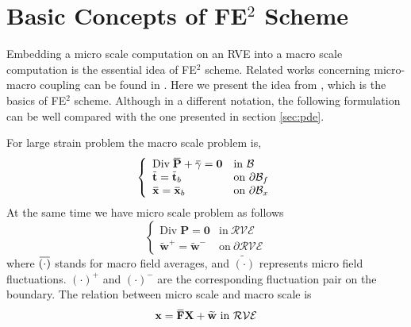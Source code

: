 \documentclass[10pt,a4paper]{scrreprt}
\newcommand{\overbar}[1]{\mkern 1.5mu\overline{\mkern-1.5mu#1\mkern-1.5mu}\mkern 1.5mu}
\begin{document}
%
%

\section{Basic Concepts of FE$^{2}$ Scheme}
Embedding a micro scale computation on an RVE into a macro scale computation is the essential idea of FE$^{2}$ scheme. Related works concerning micro-macro coupling can be found in \citep{miehe_computational_1999-1} \citep{miehe_computational_2002} \citep{miehe_computational_2003} \citep{miehe_strain-driven_2002} \citep{miehe_homogenization_2002}. Here we present the idea from \citep{miehe_computational_1999-1}, which is the basics of FE$^{2}$ scheme. Although in a different notation, the following formulation can be well compared with the one presented in section \ref{sec:pde}.

For large strain problem the macro scale problem is, 
\begin{equation}
\label{eq:macro}
\left\{
\begin{array}{ll}
\textrm{Div} \; \overbar{\mathbf{P}} + \overbar{\mathbf{\gamma}} = \mathbf{0} & \text{in} \ \mathcal{B} \\
\overbar{\mathbf{t}} = \overbar{\mathbf{t}}_{b} & \text{on} \ \partial \mathcal{B}_{f} 
\\
\overbar{\mathbf{x}} = \overbar{\mathbf{x}}_{b} & \text{on} \ \partial \mathcal{B}_{x} 
\end{array}
\right.
\end{equation}
At the same time we have micro scale problem as follows
\begin{equation}
\label{eq:micro}
\left\{
\begin{array}{ll}
\textrm{Div} \; \mathbf{P} = \mathbf{0} & \text{in} \ \mathcal{RVE} \\
\widetilde{\mathbf{w}}^{+} = \widetilde{\mathbf{w}}^{-} & \text{on} \ \partial \mathcal{RVE} 
\end{array}
\right.
\end{equation}
where $\overbar{(\cdot)}$ stands for macro field averages, and $\widetilde{(\cdot)}$ represents micro field fluctuations. $(\cdot)^{+}$ and $(\cdot)^{-}$ are the corresponding fluctuation pair on the boundary. The relation between micro scale and macro scale is 
\begin{equation}
\mathbf{x} = \overbar{\mathbf{F}} \mathbf{X} + \widetilde{\mathbf{w}} \ \text{in} \ \mathcal{RVE}
\end{equation}
\end{document}
